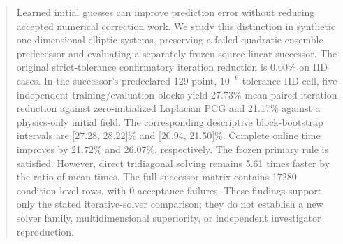 \begin{abstract}
Learned initial guesses can improve prediction error without reducing accepted numerical correction work. We study this distinction in synthetic one-dimensional elliptic systems, preserving a failed quadratic-ensemble predecessor and evaluating a separately frozen source-linear successor. The original strict-tolerance confirmatory iteration reduction is 0.00\% on IID cases. In the successor's predeclared 129-point, $10^{-6}$-tolerance IID cell, five independent training/evaluation blocks yield 27.73\% mean paired iteration reduction against zero-initialized Laplacian PCG and 21.17\% against a physics-only initial field. The corresponding descriptive block-bootstrap intervals are [27.28, 28.22]\% and [20.94, 21.50]\%. Complete online time improves by 21.72\% and 26.07\%, respectively. The frozen primary rule is satisfied. However, direct tridiagonal solving remains 5.61 times faster by the ratio of mean times. The full successor matrix contains 17280 condition-level rows, with 0 acceptance failures. These findings support only the stated iterative-solver comparison; they do not establish a new solver family, multidimensional superiority, or independent investigator reproduction.
\end{abstract}
